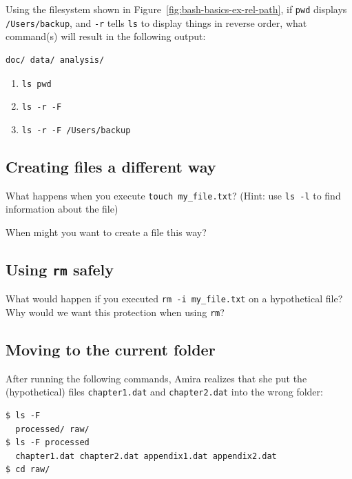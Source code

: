 \documentclass[
]{krantz}
\providecommand{\tightlist}{%
  \setlength{\itemsep}{0pt}\setlength{\parskip}{0pt}}
\begin{document}
Using the filesystem shown in Figure~\ref{fig:bash-basics-ex-rel-path},
if \texttt{pwd} displays \texttt{/Users/backup},
and \texttt{-r} tells \texttt{ls} to display things in reverse order,
what command(s) will result in the following output:

\begin{verbatim}
doc/ data/ analysis/
\end{verbatim}

\begin{enumerate}
\def\labelenumi{\arabic{enumi}.}
\tightlist
\item
  \texttt{ls\ pwd}
\item
  \texttt{ls\ -r\ -F}
\item
  \texttt{ls\ -r\ -F\ /Users/backup}
\end{enumerate}

\hypertarget{bash-basics-ex-touch}{%
\subsection{Creating files a different way}\label{bash-basics-ex-touch}}

What happens when you execute \texttt{touch\ my\_file.txt}?
(Hint: use \texttt{ls\ -l} to find information about the file)

When might you want to create a file this way?

\hypertarget{bash-basics-ex-safe-rm}{%
\subsection{\texorpdfstring{Using \texttt{rm} safely}{Using rm safely}}\label{bash-basics-ex-safe-rm}}

What would happen if you executed \texttt{rm\ -i\ my\_file.txt}
on a hypothetical file?
Why would we want this protection when using \texttt{rm}?

\hypertarget{bash-basics-ex-move-dot}{%
\subsection{Moving to the current folder}\label{bash-basics-ex-move-dot}}

After running the following commands,
Amira realizes that she put the (hypothetical) files \texttt{chapter1.dat} and \texttt{chapter2.dat} into the wrong folder:

\begin{verbatim}
$ ls -F
  processed/ raw/
$ ls -F processed
  chapter1.dat chapter2.dat appendix1.dat appendix2.dat
$ cd raw/
\end{verbatim}
\end{document}
